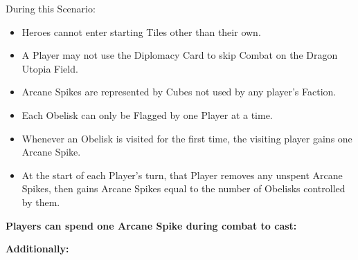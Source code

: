 \begin{multicols}{2}
During this Scenario:

\begin{itemize}
  \item Heroes cannot enter starting Tiles other than their own.
  \item A Player may not use the Diplomacy Card to skip Combat on the Dragon Utopia Field.
  \item Arcane Spikes are represented by Cubes not used by any player's Faction.
  \item Each Obelisk can only be Flagged by one Player at a time.
  \item Whenever an Obelisk is visited for the first time, the visiting player gains one Arcane Spike.
  \item At the start of each Player's turn, that Player removes any unspent Arcane Spikes, then gains Arcane Spikes equal to the number of Obelisks controlled by them.
\end{itemize}

\vspace{3em}

\begin{center}
\end{center}

\textbf{Players can spend one Arcane Spike during combat to cast:}


\textbf{Additionally:}


\end{multicols}
